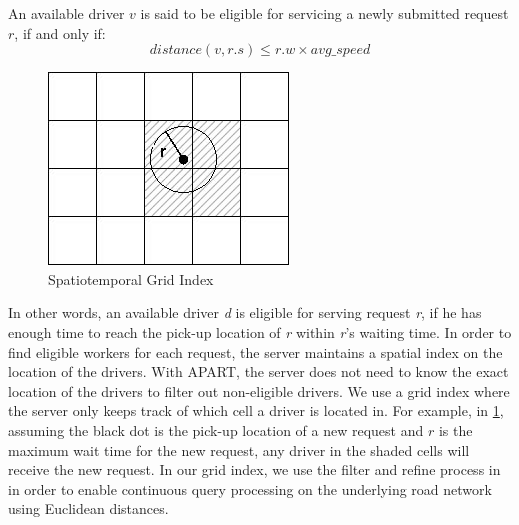 \begin{definition} 
An available driver $v$ is said to be eligible for servicing a newly submitted request $r$, if and only if:
\vspace{-2mm}
\begin{equation*}
distance(v, r.s) \leq r.w \times avg\_speed
\end{equation*}
\end{definition}

\vspace{-2mm}
\begin{figure}[!ht]
	\centering
	\includegraphics[width=0.35\columnwidth]{fig/grid_index.jpg}
	\vspace{-0mm}\caption{Spatiotemporal Grid Index} \vspace{-2mm} \label{fig:grid_index}
\end{figure}\vspace{-0mm}

\noindent In other words, an available driver \textit{d} is eligible for serving request \textit{r}, if he has enough time to reach the pick-up location of \textit{r} within \textit{r}'s waiting time. In order to find eligible workers for each request, the server maintains a spatial index on the location of the drivers. With APART, the server does not need to know the exact location of the drivers to filter out non-eligible drivers. We use a grid index where the server only keeps track of which cell a driver is located in. For example, in \cref{fig:grid_index}, assuming the black dot is the pick-up location of a new request and $r$ is the maximum wait time for the new request, any driver in the shaded cells will receive the new request. In our grid index, we use the filter and refine process in \cite{Demiryurek09} in order to enable continuous query processing on the underlying road network using Euclidean distances.

